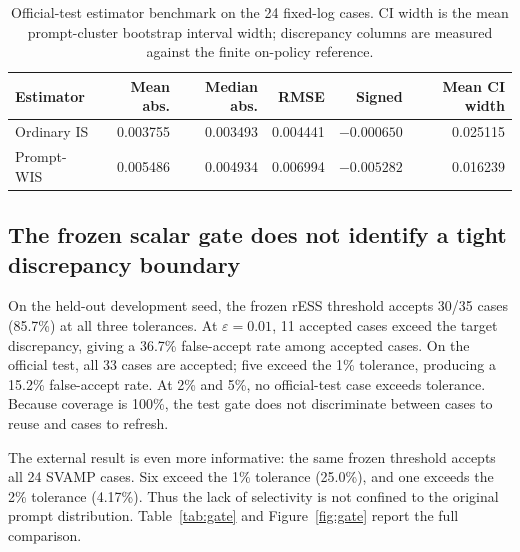 \documentclass[10pt]{article}
\theoremstyle{remark}
\begin{document}
\begin{table}[H]
\centering
\caption{Official-test estimator benchmark on the 24 fixed-log cases. CI width is the mean prompt-cluster bootstrap interval width; discrepancy columns are measured against the finite on-policy reference.}
\label{tab:estimators}
\small
\begin{tabular}{@{}lrrrrr@{}}
\toprule
Estimator & Mean abs. & Median abs. & RMSE & Signed & Mean CI width \\
\midrule
Ordinary IS & 0.003755 & 0.003493 & 0.004441 & $-0.000650$ & 0.025115 \\
Prompt-WIS & 0.005486 & 0.004934 & 0.006994 & $-0.005282$ & 0.016239 \\
\bottomrule
\end{tabular}
\end{table}

\subsection{The frozen scalar gate does not identify a tight discrepancy boundary}
On the held-out development seed, the frozen rESS threshold accepts 30/35 cases (85.7\%) at all three tolerances. At $\varepsilon=0.01$, 11 accepted cases exceed the target discrepancy, giving a 36.7\% false-accept rate among accepted cases. On the official test, all 33 cases are accepted; five exceed the 1\% tolerance, producing a 15.2\% false-accept rate. At 2\% and 5\%, no official-test case exceeds tolerance. Because coverage is 100\%, the test gate does not discriminate between cases to reuse and cases to refresh.

The external result is even more informative: the same frozen threshold accepts all 24 SVAMP cases. Six exceed the 1\% tolerance (25.0\%), and one exceeds the 2\% tolerance (4.17\%). Thus the lack of selectivity is not confined to the original prompt distribution. Table~\ref{tab:gate} and Figure~\ref{fig:gate} report the full comparison.
\end{document}
